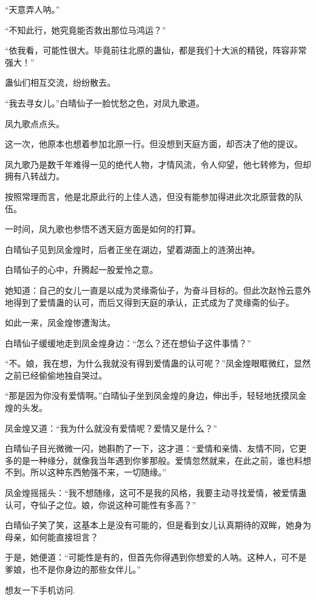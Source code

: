 \begin{this_body}
“天意弄人呐。”

“不知此行，她究竟能否救出那位马鸿运？”

“依我看，可能性很大。毕竟前往北原的蛊仙，都是我们十大派的精锐，阵容非常强大！”

蛊仙们相互交流，纷纷散去。

“我去寻女儿。”白晴仙子一脸忧愁之色，对凤九歌道。

凤九歌点点头。

这一次，他原本也想着参加北原一行。但没想到天庭方面，却否决了他的提议。

凤九歌乃是数千年难得一见的绝代人物，才情风流，令人仰望，他七转修为，但却拥有八转战力。

按照常理而言，他是北原此行的上佳人选，但没有能参加得进此次北原营救的队伍。

一时间，凤九歌也参悟不透天庭方面是如何的打算。

白晴仙子见到凤金煌时，后者正坐在湖边，望着湖面上的涟漪出神。

白晴仙子的心中，升腾起一股爱怜之意。

她知道：自己的女儿一直是以成为灵缘斋仙子，为奋斗目标的。但此次赵怜云意外地得到了爱情蛊的认可，而后又得到天庭的承认，正式成为了灵缘斋的仙子。

如此一来，凤金煌惨遭淘汰。

白晴仙子缓缓地走到凤金煌身边：“怎么？还在想仙子这件事情？”

“不。娘，我在想，为什么我就没有得到爱情蛊的认可呢？”凤金煌眼眶微红，显然之前已经偷偷地独自哭过。

“那是因为你没有爱情啊。”白晴仙子坐到凤金煌的身边，伸出手，轻轻地抚摸凤金煌的头发。

凤金煌又道：“我为什么就没有爱情呢？爱情又是什么？”

白晴仙子目光微微一闪，她斟酌了一下，这才道：“爱情和亲情、友情不同，它更多的是一种缘分，就像我当年遇到你爹那般。爱情忽然就来，在此之前，谁也料想不到。所以这种东西勉强不来，一切随缘。”

凤金煌摇摇头：“我不想随缘，这可不是我的风格，我要主动寻找爱情，被爱情蛊认可，夺仙子之位。娘，你说这种可能性有多高？”

白晴仙子笑了笑，这基本上是没有可能的，但是看到女儿认真期待的双眸，她身为母亲，如何能直接坦言？

于是，她便道：“可能性是有的，但首先你得遇到你想爱的人呐。这种人，可不是爹娘，也不是你身边的那些女伴儿。”

想友一下手机访问.

\end{this_body}

